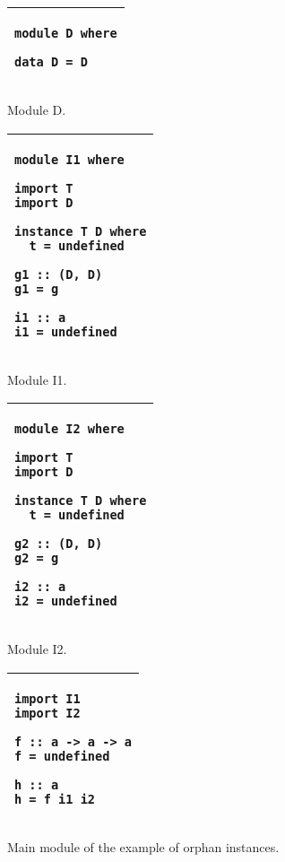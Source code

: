 \documentclass[msc]{ppgccufmg}
\begin{document}
\begin{figure}
\caption{Module D.\label{D}}
\begin{tabular}{|p{\textwidth}|}
\hline
\begin{verbatim}
module D where

data D = D
\end{verbatim}
\\
\hline
\end{tabular}
\end{figure}

\begin{figure}
\caption{Module I1.\label{I1}}
\begin{tabular}{|p{\textwidth}|}
\hline
\begin{verbatim}
module I1 where

import T
import D

instance T D where
  t = undefined

g1 :: (D, D)
g1 = g

i1 :: a
i1 = undefined
\end{verbatim}
\\
\hline
\end{tabular}
\end{figure}

\begin{figure}
\caption{Module I2.\label{I2}}
\begin{tabular}{|p{\textwidth}|}
\hline
\begin{verbatim}
module I2 where

import T
import D

instance T D where
  t = undefined

g2 :: (D, D)
g2 = g

i2 :: a
i2 = undefined
\end{verbatim}
\\
\hline
\end{tabular}
\end{figure}

\begin{figure}
\caption{Main module of the example of orphan instances.\label{main}}
\begin{tabular}{|p{\textwidth}|}
\hline
\begin{verbatim}
import I1
import I2

f :: a -> a -> a
f = undefined

h :: a
h = f i1 i2
\end{verbatim}
\\
\hline
\end{tabular}
\end{figure}
\end{document}
